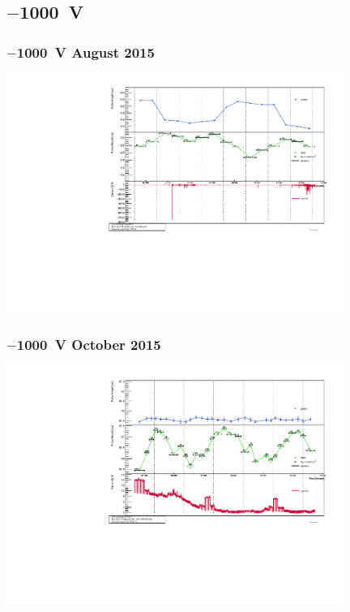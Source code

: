 \documentclass[9pt]{beamer}
\begin{document}
\subsection{$-$\SI{1000}{V}}
\begin{frame}
	\frametitle{$-$\SI{1000}{V} August 2015}
	\vspace*{-15pt}
	\begin{center}
		\includegraphics[angle=270, width=11cm]{PhPulserCurrent_201508_rp13B2}
	\end{center}
\end{frame}
\begin{frame}
	\frametitle{$-$\SI{1000}{V} October 2015}
	\vspace*{-15pt}
	\begin{center}
		\includegraphics[angle=270, width=11cm]{PhPulserCurrent_201510_rp101B2.pdf}
	\end{center}
\end{frame}
\end{document}
